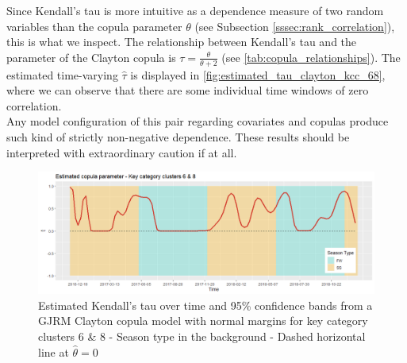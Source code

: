 Since Kendall's tau is more intuitive as a dependence measure of two random variables than the copula parameter $\theta$ (see Subsection \ref{sssec:rank_correlation}), this is what we inspect. The relationship between Kendall's tau and the parameter of the Clayton copula is $\tau = \frac{\theta}{\theta + 2}$ (see \autoref{tab:copula_relationships}). The estimated time-varying $\hat{\tau}$ is displayed in \autoref{fig:estimated_tau_clayton_kcc_68}, where we can observe that 
there are some individual time windows of zero correlation.\\
Any model configuration of this pair regarding covariates and copulas produce such kind of strictly non-negative dependence. These results should be interpreted with extraordinary caution if at all.
\\



\begin{figure}[H]
\centering
  \includegraphics[width=0.95\linewidth]{figures/estimated_tau_clayton_kcc_68.png}
  \caption{Estimated Kendall's tau over time and 95\% confidence bands from a \ac{GJRM} Clayton copula model with normal margins for key category clusters 6 \& 8 - Season type in the background - Dashed horizontal line at $\hat{\theta} = 0$}
  \label{fig:estimated_tau_clayton_kcc_68}
\end{figure}

































